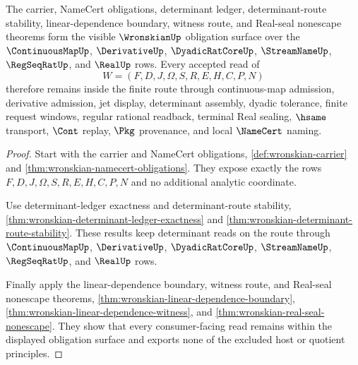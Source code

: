 \begin{theorem}
\label{thm:wronskian-obligation-closure-scope}
The carrier, NameCert obligations, determinant ledger, determinant-route stability, linear-dependence boundary, witness route, and Real-seal nonescape theorems form the visible $\WronskianUp$ obligation surface over the $\ContinuousMapUp$, $\DerivativeUp$, $\DyadicRatCoreUp$, $\StreamNameUp$, $\RegSeqRatUp$, and $\RealUp$ rows. Every accepted read of
$$
W=(F,D,J,\Omega,S,R,E,H,C,P,N)
$$
therefore remains inside the finite route through continuous-map admission, derivative admission, jet display, determinant assembly, dyadic tolerance, finite request windows, regular rational readback, terminal Real sealing, $\hsame$ transport, $\Cont$ replay, $\Pkg$ provenance, and local $\NameCert$ naming.
\end{theorem}
\begin{proof}
Start with the carrier and NameCert obligations, \autoref{def:wronskian-carrier} and \autoref{thm:wronskian-namecert-obligations}. They expose exactly the rows $F,D,J,\Omega,S,R,E,H,C,P,N$ and no additional analytic coordinate.

Use determinant-ledger exactness and determinant-route stability, \autoref{thm:wronskian-determinant-ledger-exactness} and \autoref{thm:wronskian-determinant-route-stability}. These results keep determinant reads on the route through $\ContinuousMapUp$, $\DerivativeUp$, $\DyadicRatCoreUp$, $\StreamNameUp$, $\RegSeqRatUp$, and $\RealUp$ rows.

Finally apply the linear-dependence boundary, witness route, and Real-seal nonescape theorems, \autoref{thm:wronskian-linear-dependence-boundary}, \autoref{thm:wronskian-linear-dependence-witness}, and \autoref{thm:wronskian-real-seal-nonescape}. They show that every consumer-facing read remains within the displayed obligation surface and exports none of the excluded host or quotient principles.
\end{proof}

